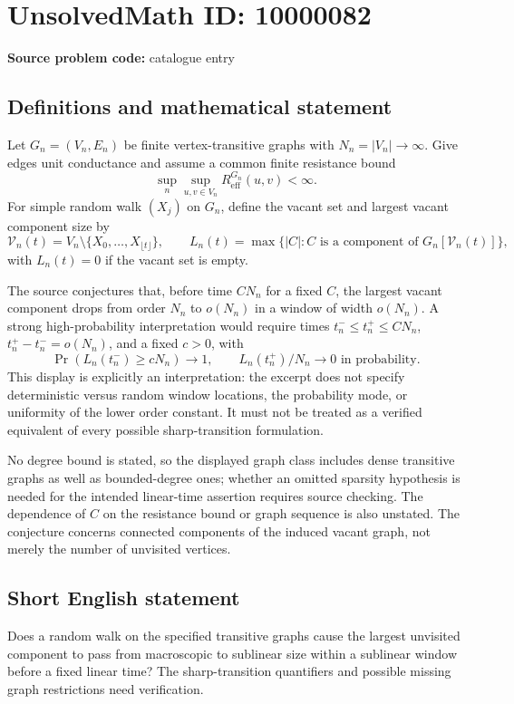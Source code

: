 \documentclass[11pt]{article}
\begin{document}
\section*{UnsolvedMath ID: 10000082}
\textbf{Source problem code:} catalogue entry
\subsection{Definitions and mathematical statement}
Let \(G_n=(V_n,E_n)\) be finite vertex-transitive graphs with \(N_n=|V_n|\to\infty\). Give edges unit conductance and assume a common finite resistance bound
\[
 \sup_n\sup_{u,v\in V_n}R_{\mathrm{eff}}^{G_n}(u,v)<\infty.
\]
For simple random walk \((X_j)\) on \(G_n\), define the vacant set and largest vacant component size by
\[
 \mathcal V_n(t)=V_n\setminus\{X_0,\ldots,X_{\lfloor t\rfloor}\},\qquad
 L_n(t)=\max\{|C|:C\text{ is a component of }G_n[\mathcal V_n(t)]\},
\]
with \(L_n(t)=0\) if the vacant set is empty.

The source conjectures that, before time \(CN_n\) for a fixed \(C\), the largest vacant component drops from order \(N_n\) to \(o(N_n)\) in a window of width \(o(N_n)\). A strong high-probability interpretation would require times \(t_n^-\leq t_n^+\leq CN_n\), \(t_n^+-t_n^-=o(N_n)\), and a fixed \(c>0\), with
\[
 \Pr(L_n(t_n^-)\geq cN_n)\to1,\qquad
 L_n(t_n^+)/N_n\to0\text{ in probability}.
\]
This display is explicitly an interpretation: the excerpt does not specify deterministic versus random window locations, the probability mode, or uniformity of the lower order constant. It must not be treated as a verified equivalent of every possible sharp-transition formulation.

No degree bound is stated, so the displayed graph class includes dense transitive graphs as well as bounded-degree ones; whether an omitted sparsity hypothesis is needed for the intended linear-time assertion requires source checking. The dependence of \(C\) on the resistance bound or graph sequence is also unstated. The conjecture concerns connected components of the induced vacant graph, not merely the number of unvisited vertices.
\subsection{Short English statement}
Does a random walk on the specified transitive graphs cause the largest unvisited component to pass from macroscopic to sublinear size within a sublinear window before a fixed linear time? The sharp-transition quantifiers and possible missing graph restrictions need verification.
\end{document}
